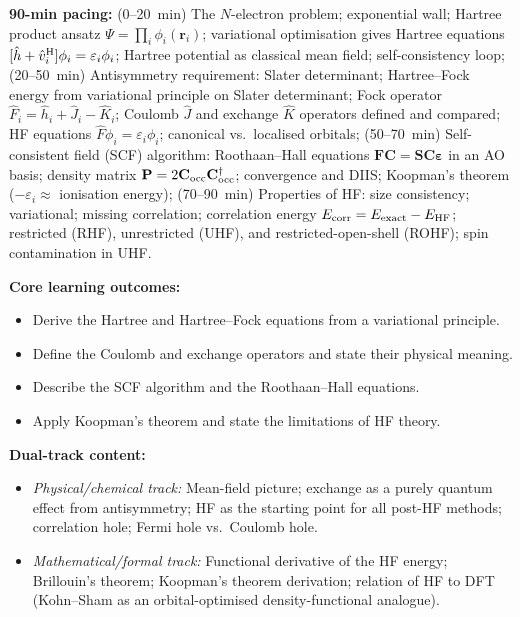 \documentclass[11pt,a4paper]{article}
\begin{document}
\begin{tcolorbox}[modulebox, title={Module~II.1 / L03: Hartree and Hartree--Fock Theory}]
\textbf{90-min pacing:} (0--20~min) The $N$-electron problem; exponential wall;
Hartree product ansatz $\Psi=\prod_i\phi_i(\mathbf{r}_i)$; variational optimisation
gives Hartree equations $[\hat{h}+\hat{v}^{\rm H}_i]\phi_i=\varepsilon_i\phi_i$;
Hartree potential as classical mean field; self-consistency loop;
(20--50~min) Antisymmetry requirement: Slater determinant;
Hartree--Fock energy from variational principle on Slater determinant;
Fock operator $\hat{F}_i=\hat{h}_i+\hat{J}_i-\hat{K}_i$;
Coulomb $\hat{J}$ and exchange $\hat{K}$ operators defined and compared;
HF equations $\hat{F}\phi_i=\varepsilon_i\phi_i$;
canonical vs.\ localised orbitals;
(50--70~min) Self-consistent field (SCF) algorithm: Roothaan--Hall equations
$\mathbf{F}\mathbf{C}=\mathbf{S}\mathbf{C}\boldsymbol{\varepsilon}$ in an AO basis;
density matrix $\mathbf{P}=2\mathbf{C}_{\rm occ}\mathbf{C}_{\rm occ}^\dagger$;
convergence and DIIS; Koopman's theorem ($-\varepsilon_i \approx$ ionisation energy);
(70--90~min) Properties of HF: size consistency; variational; missing correlation;
correlation energy $E_{\rm corr}=E_{\rm exact}-E_{\rm HF}$;
restricted (RHF), unrestricted (UHF), and restricted-open-shell (ROHF);
spin contamination in UHF.

\medskip\textbf{Core learning outcomes:}
\begin{itemize}[leftmargin=1.4em,topsep=2pt,itemsep=1pt]
  \item Derive the Hartree and Hartree--Fock equations from a variational principle.
  \item Define the Coulomb and exchange operators and state their physical meaning.
  \item Describe the SCF algorithm and the Roothaan--Hall equations.
  \item Apply Koopman's theorem and state the limitations of HF theory.
\end{itemize}

\medskip\textbf{Dual-track content:}
\begin{itemize}[leftmargin=1.4em,topsep=2pt,itemsep=1pt]
  \item \textit{Physical/chemical track:} Mean-field picture; exchange as a purely quantum
    effect from antisymmetry; HF as the starting point for all post-HF methods;
    correlation hole; Fermi hole vs.\ Coulomb hole.
  \item \textit{Mathematical/formal track:} Functional derivative of the HF energy;
    Brillouin's theorem; Koopman's theorem derivation; relation of HF to DFT
    (Kohn--Sham as an orbital-optimised density-functional analogue).
\end{itemize}


\end{tcolorbox}
\end{document}
